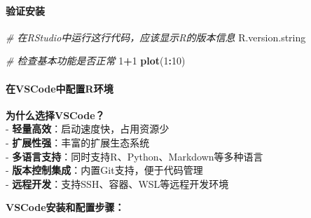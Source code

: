 \documentclass[
]{book}
\newenvironment{Shaded}{\begin{snugshade}}{\end{snugshade}}
\newcommand{\CommentTok}[1]{\textcolor[rgb]{0.56,0.35,0.01}{\textit{#1}}}
\newcommand{\DecValTok}[1]{\textcolor[rgb]{0.00,0.00,0.81}{#1}}
\newcommand{\FunctionTok}[1]{\textcolor[rgb]{0.13,0.29,0.53}{\textbf{#1}}}
\newcommand{\NormalTok}[1]{#1}
\newcommand{\SpecialCharTok}[1]{\textcolor[rgb]{0.81,0.36,0.00}{\textbf{#1}}}
\begin{document}
\hypertarget{ux9a8cux8bc1ux5b89ux88c5}{%
\paragraph{验证安装}\label{ux9a8cux8bc1ux5b89ux88c5}}

\begin{Shaded}
\begin{Highlighting}[]
\CommentTok{\# 在RStudio中运行这行代码，应该显示R的版本信息}
\NormalTok{R.version.string}

\CommentTok{\# 检查基本功能是否正常}
\DecValTok{1}\SpecialCharTok{+}\DecValTok{1}
\FunctionTok{plot}\NormalTok{(}\DecValTok{1}\SpecialCharTok{:}\DecValTok{10}\NormalTok{)}
\end{Highlighting}
\end{Shaded}

\hypertarget{ux5728vscodeux4e2dux914dux7f6erux73afux5883}{%
\paragraph{在VSCode中配置R环境}\label{ux5728vscodeux4e2dux914dux7f6erux73afux5883}}

\textbf{为什么选择VSCode？}\\
- \textbf{轻量高效}：启动速度快，占用资源少\\
- \textbf{扩展性强}：丰富的扩展生态系统\\
- \textbf{多语言支持}：同时支持R、Python、Markdown等多种语言\\
- \textbf{版本控制集成}：内置Git支持，便于代码管理\\
- \textbf{远程开发}：支持SSH、容器、WSL等远程开发环境

\textbf{VSCode安装和配置步骤：}
\end{document}
